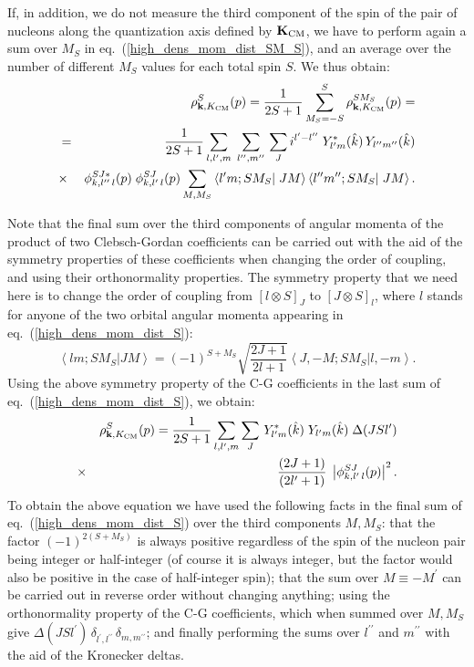 \documentclass[aps,twocolumn,showpacs,preprintnumbers,amsmath,amssymb,nofootinbib,superscriptaddress,showkeys,noeprint]{revtex4-1}
\newcommand{\nk}{{\bf k}}
\newcommand{\nK}{{\bf K}}
\begin{document}
If, in addition, we do not measure the third component of the spin of
the pair of nucleons along the quantization axis defined by $\nK_{\rm
  CM}$, we have to perform again a sum over $M_S$ in
eq.~(\ref{high_dens_mom_dist_SM_S}), and an average over the number of
different $M_S$ values for each total spin $S$. We thus obtain:
\begin{eqnarray}
&&\rho^{S}_{\nk,K_{\rm CM}}(p) = \frac{1}{2S+1} \sum^{S}_{M_S=-S}
\rho^{SM_S}_{\nk,K_{\rm CM}}(p)=\nonumber\\
&=& \frac{1}{2S+1} \sum_{l,l^\prime,m}\;
\sum_{l^{\prime\prime},m^{\prime\prime}}\,\sum_J
i^{l^\prime-l^{\prime\prime}}\;Y^*_{l^\prime m}(\hat{k})\, 
Y_{l^{\prime\prime} m^{\prime\prime}}(\hat{k})\nonumber\\
&\times&\phi^{SJ *}_{k, l^{\prime\prime}\,l}(p)\;\phi^{SJ}_{k,l^\prime\,l}(p)
\sum_{M,M_S}
\left\langle l^\prime m;SM_S\right|\left.JM\right\rangle
\left\langle l^{\prime\prime} m^{\prime\prime};SM_S\right|\left.J M\right\rangle.
\nonumber\\
\label{high_dens_mom_dist_S}
\end{eqnarray}

Note that the final sum over the third components of angular momenta
of the product of two Clebsch-Gordan coefficients can be carried out
with the aid of the symmetry properties of these coefficients when
changing the order of coupling, and using their orthonormality
properties.  The symmetry property that we need here is to change the
order of coupling from $\left[l\otimes S \right]_J$ to $\left[J\otimes
  S \right]_{l}$, where $l$ stands for anyone of the two orbital
angular momenta appearing in eq.~(\ref{high_dens_mom_dist_S}):
\begin{equation}\label{C-G_symmetry_property}
\left\langle lm; SM_S\right|\left.JM\right\rangle=(-1)^{S+M_S}
\sqrt{\frac{2J+1}{2l+1}}\left\langle J,-M;SM_S\right|\left.l,-m\right\rangle.
\end{equation}
Using the above symmetry property of the C-G coefficients in the last
sum of eq.~(\ref{high_dens_mom_dist_S}), we obtain:
\begin{eqnarray}
&&\rho^{S}_{\nk,K_{\rm CM}}(p)= \frac{1}{2S+1}\sum_{l,l^\prime,m}
\sum_J \, Y^*_{l^\prime m}(\hat{k})\; Y_{l^\prime m}(\hat{k})\;
\Delta(JSl^\prime)\nonumber\\
&\times&\frac{(2J+1)}{(2l^\prime+1)}\;\left| \phi^{SJ}_{k, l^\prime\,l}(p)
\right|^2.\label{high_dens_mom_dist_S_2}
\end{eqnarray}
To obtain the above equation we have used the following facts in the
final sum of eq.~(\ref{high_dens_mom_dist_S}) over the third
components $M,M_S$: that the factor $(-1)^{2(S+M_S)}$ is always
positive regardless of the spin of the nucleon pair being integer or
half-integer (of course it is always integer, but the factor would
also be positive in the case of half-integer spin); that the sum over
$M\equiv-M^\prime$ can be carried out in reverse order without
changing anything; using the orthonormality property of the C-G
coefficients, which when summed over $M,M_S$ give
$\Delta(JSl^\prime)\,\delta_{l^\prime,l^{\prime\prime}}\,
\delta_{m,m^{\prime\prime}}$; and finally performing the sums over
$l^{\prime\prime}$ and $m^{\prime\prime}$ with the aid of the
Kronecker deltas.
\end{document}
